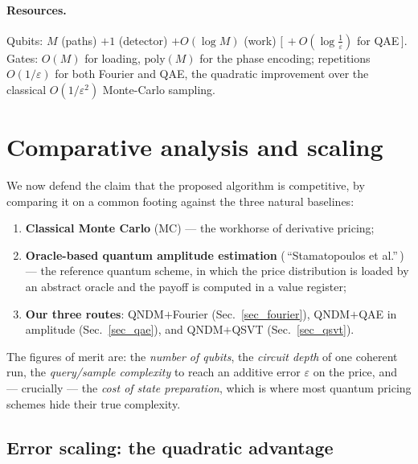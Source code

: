 \documentclass{article}
\begin{document}
\paragraph{Resources.} Qubits: $M$ (paths) $+1$ (detector) $+O(\log M)$ (work) $[\,+O(\log\frac1\varepsilon)$ for QAE$\,]$. Gates: $O(M)$ for loading, $\mathrm{poly}(M)$ for the phase encoding; repetitions $O(1/\varepsilon)$ for both Fourier and QAE, the quadratic improvement over the classical $O(1/\varepsilon^2)$ Monte-Carlo sampling.


\section{Comparative analysis and scaling}\label{sec_scaling}

We now defend the claim that the proposed algorithm is competitive, by comparing it on a common footing against the three natural baselines:
\begin{enumerate}
    \item \textbf{Classical Monte Carlo} (MC) \cite{glasserman2004monte} --- the workhorse of derivative pricing;
    \item \textbf{Oracle-based quantum amplitude estimation} (\,``Stamatopoulos et al.''\,) \cite{Stamatopoulos_2020} --- the reference quantum scheme, in which the price distribution is loaded by an abstract oracle and the payoff is computed in a value register;
    \item \textbf{Our three routes}: QNDM$+$Fourier (Sec.~\ref{sec_fourier}), QNDM$+$QAE in amplitude (Sec.~\ref{sec_qae}), and QNDM$+$QSVT (Sec.~\ref{sec_qsvt}).
\end{enumerate}
The figures of merit are: the \emph{number of qubits}, the \emph{circuit depth} of one coherent run, the \emph{query/sample complexity} to reach an additive error $\varepsilon$ on the price, and --- crucially --- the \emph{cost of state preparation}, which is where most quantum pricing schemes hide their true complexity.

\subsection{Error scaling: the quadratic advantage}
\end{document}
